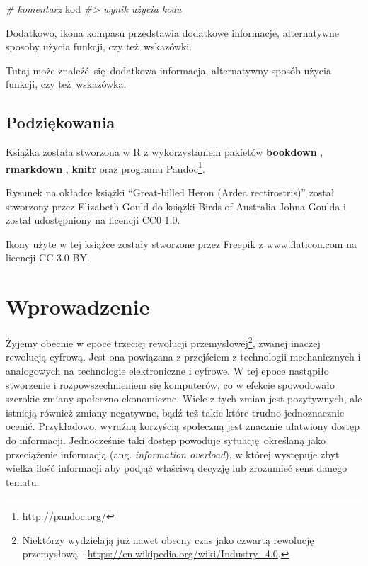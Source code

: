 \documentclass[paper=6in:9in,pagesize=pdftex,headinclude=on,footinclude=on,10pt]{scrbook}
\makeatletter
\newenvironment{Shaded}{\begin{snugshade}}{\end{snugshade}}
\newcommand{\CommentTok}[1]{\textcolor[rgb]{0.56,0.35,0.01}{\textit{#1}}}
\newcommand{\NormalTok}[1]{#1}
\DeclareRobustCommand{\href}[2]{#2\footnote{\url{#1}}}
\newenvironment{kframe}{%
\medskip{}
\setlength{\fboxsep}{.8em}
 \def\at@end@of@kframe{}%
 \ifinner\ifhmode%
  \def\at@end@of@kframe{\end{minipage}}%
  \begin{minipage}{\columnwidth}%
 \fi\fi%
 \def\FrameCommand##1{\hskip\@totalleftmargin \hskip-\fboxsep
 \colorbox{shadecolor}{##1}\hskip-\fboxsep
     \hskip-\linewidth \hskip-\@totalleftmargin \hskip\columnwidth}%
 \MakeFramed {\advance\hsize-\width
   \@totalleftmargin\z@ \linewidth\hsize
   \@setminipage}}%
 {\par\unskip\endMakeFramed%
 \at@end@of@kframe}
\newenvironment{rmdblock}[1]
  {
  \begin{itemize}
  \renewcommand{\labelitemi}{
    \raisebox{-.7\height}[0pt][0pt]{
      {\setkeys{Gin}{width=3em,keepaspectratio}\texttt{[image: images/\#1]}}
    }
  }
  \setlength{\fboxsep}{1em}
  \begin{kframe}
  \item
  }
  {
  \end{kframe}
  \end{itemize}
  }
\newenvironment{rmdinfo}
  {\begin{rmdblock}{compass}}
  {\end{rmdblock}}
\makeatother
\begin{document}
\begin{Shaded}
\begin{Highlighting}[]
\CommentTok{# komentarz}
\NormalTok{kod}
\CommentTok{#> wynik użycia kodu}
\end{Highlighting}
\end{Shaded}

Dodatkowo, ikona kompasu przedstawia dodatkowe informacje, alternatywne sposoby użycia funkcji, czy też~wskazówki.

\begin{rmdinfo}
\begin{rmdinfo}

Tutaj może znaleźć~się~dodatkowa informacja, alternatywny sposób użycia funkcji, czy też~wskazówka.

\end{rmdinfo}
\end{rmdinfo}

\hypertarget{podziux119kowania}{%
\section*{Podziękowania}\label{podziux119kowania}}

Książka została stworzona w R \citep{R-base} z wykorzystaniem pakietów \textbf{bookdown} \citep{R-bookdown}, \textbf{rmarkdown} \citep{R-rmarkdown}, \textbf{knitr} \citep{R-knitr} oraz programu \href{http://pandoc.org/}{Pandoc}.

Rysunek na okładce książki ``Great-billed Heron (Ardea rectirostris)'' został stworzony przez Elizabeth Gould do książki Birds of Australia Johna Goulda i został udostępniony na licencji CC0 1.0.

Ikony użyte w tej książce zostały stworzone przez Freepik z www.flaticon.com na licencji CC 3.0 BY.

\hypertarget{wprowadzenie}{%
\chapter{Wprowadzenie}\label{wprowadzenie}}

Żyjemy obecnie w epoce trzeciej rewolucji przemysłowej\footnote{Niektórzy wydzielają już nawet obecny czas jako czwartą rewolucję przemysłową - \url{https://en.wikipedia.org/wiki/Industry_4.0}.}, zwanej inaczej rewolucją cyfrową.
Jest ona powiązana z przejściem z technologii mechanicznych i analogowych na technologie elektroniczne i cyfrowe.
W tej epoce nastąpiło stworzenie i rozpowszechnieniem się komputerów, co w efekcie spowodowało szerokie zmiany społeczno-ekonomiczne.
Wiele z tych zmian jest pozytywnych, ale istnieją również zmiany negatywne, bądź też takie które trudno jednoznacznie ocenić.
Przykładowo, wyraźną korzyścią społeczną jest znacznie ułatwiony dostęp do informacji.
Jednocześnie taki dostęp powoduje sytuację~określaną jako przeciążenie informacją (ang. \emph{information overload}), w której występuje zbyt wielka ilość informacji aby podjąć właściwą decyzję lub zrozumieć sens danego tematu.
\end{document}
